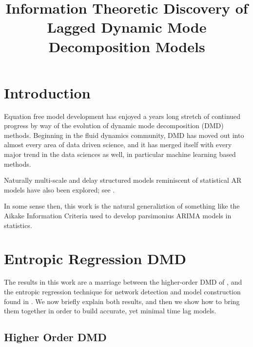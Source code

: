 \documentclass[a4paper,11pt]{article}
\title{Information Theoretic Discovery of Lagged Dynamic Mode Decomposition Models}
\date{}
\begin{document}
\maketitle
\section{Introduction}

Equation free model development has enjoyed a years long stretch of continued progress by way of the evolution of dynamic mode decomposition (DMD) methods.  Beginning in the fluid dynamics community, DMD has moved out into almost every area of data driven science, and it has merged itself with every major trend in the data sciences as well, in particular machine learning based methods.  

Naturally multi-scale and delay structured models reminiscent of statistical AR models have also been explored; see \cite{clainche,  ssdmd}.  

In some sense then, this work is the natural generaliztion of something like the Aikake Information Criteria used to develop parsimonius ARIMA models in statistics.  

\section{Entropic Regression DMD}

The results in this work are a marriage between the higher-order DMD of \cite{clainche}, and the entropic regression technique for network detection and model construction found in \cite{bollt, bollt2}.  We now briefly explain both results, and then we show how to bring them together in order to build accurate, yet minimal time lag models.     

\subsection{Higher Order DMD}
\end{document}
